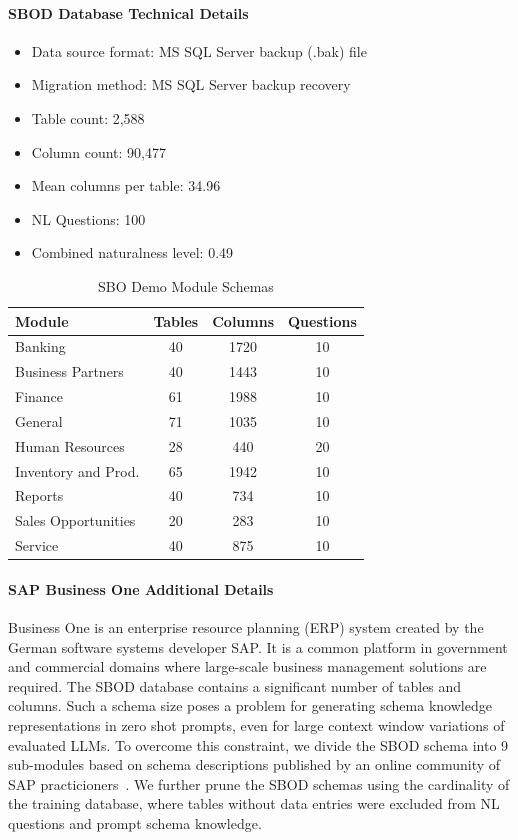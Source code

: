 \paragraph{SBOD Database Technical Details}
\begin{itemize}
  \item Data source format: MS SQL Server backup (.bak) file
  \item Migration method: MS SQL Server backup recovery
  \item Table count: 2,588
  \item Column count: 90,477
  \item Mean columns per table: 34.96
  \item NL Questions: 100
  \item Combined naturalness level: 0.49 
\end{itemize}

\begin{table}[th]
  \centering
  \begin{tabular}{|p{3.2cm}|c|c|c|}
  \hline
  \textbf{Module} & \textbf{Tables} & \textbf{Columns} & \textbf{Questions} \\
  \hline
  Banking & 40 & 1720 & 10 \\
  Business Partners & 40 & 1443 & 10 \\
  Finance & 61 & 1988 & 10 \\
  General & 71 & 1035 & 10 \\
  Human Resources & 28 & 440 & 20 \\
  Inventory and Prod. & 65 & 1942 & 10 \\
  Reports & 40 & 734 & 10 \\
  Sales Opportunities & 20 & 283 & 10 \\
  Service & 40 & 875 & 10 \\
  \hline
  \end{tabular}
  \caption{SBO Demo Module Schemas}
  \label{table:sapmodulechemas-appendix}
\end{table}

\paragraph{SAP Business One Additional Details}
Business One is an enterprise resource planning (ERP) system created by the German software systems developer SAP.
It is a common platform in government and commercial domains where large-scale business management solutions are required.
The SBOD database contains a significant number of tables and columns.
Such a schema size poses a problem for generating schema knowledge representations in zero shot prompts, even for large context window variations of evaluated LLMs.
To overcome this constraint, we divide the SBOD schema into 9 sub-modules based on schema descriptions published by an online community of SAP practicioners~\cite{sap-erpref}.
We further prune the SBOD schemas using the cardinality of the training database, where tables without data entries were excluded from NL questions and prompt schema knowledge.

